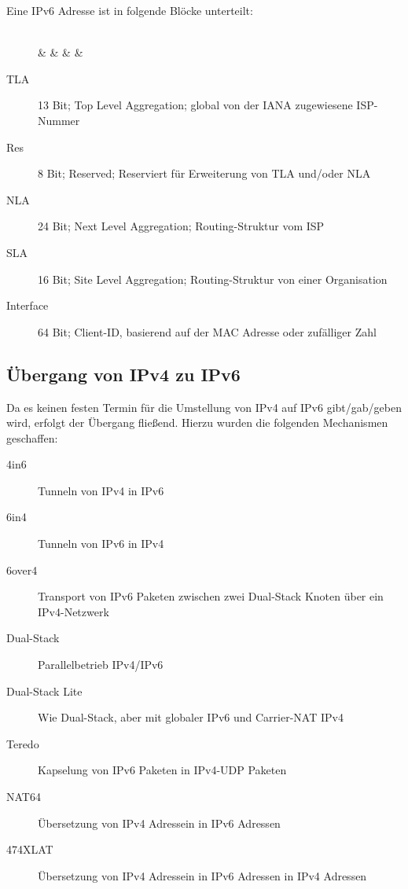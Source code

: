 			Eine IPv6 Adresse ist in folgende Blöcke unterteilt:
			\begin{figure}[H]
				\centering
				\begin{bytefield}[bitwidth = 7pt]{64}
					 \\
					 &  &  &  &  \\
				\end{bytefield}
			\end{figure}
			\begin{description}
				\item[TLA] 13 Bit; Top Level Aggregation; global von der IANA zugewiesene ISP-Nummer
				\item[Res] 8 Bit; Reserved; Reserviert für Erweiterung von TLA und/oder NLA
				\item[NLA] 24 Bit; Next Level Aggregation; Routing-Struktur vom ISP
				\item[SLA] 16 Bit; Site Level Aggregation; Routing-Struktur von einer Organisation
				\item[Interface] 64 Bit; Client-ID, basierend auf der MAC Adresse oder zufälliger Zahl
			\end{description}

		\subsection{Übergang von IPv4 zu IPv6}
			Da es keinen festen Termin für die Umstellung von IPv4 auf IPv6 gibt/gab/geben wird, erfolgt der Übergang fließend. Hierzu wurden die folgenden Mechanismen geschaffen:
			\begin{description}
				\item[4in6] Tunneln von IPv4 in IPv6
				\item[6in4] Tunneln von IPv6 in IPv4
				\item[6over4] Transport von IPv6 Paketen zwischen zwei Dual-Stack Knoten über ein IPv4-Netzwerk
				\item[Dual-Stack] Parallelbetrieb IPv4/IPv6
				\item[Dual-Stack Lite] Wie Dual-Stack, aber mit globaler IPv6 und Carrier-NAT IPv4
				\item[Teredo] Kapselung von IPv6 Paketen in IPv4-UDP Paketen
				\item[NAT64] Übersetzung von IPv4 Adressein in IPv6 Adressen
				\item[474XLAT] Übersetzung von IPv4 Adressein in IPv6 Adressen in IPv4 Adressen
			\end{description}

